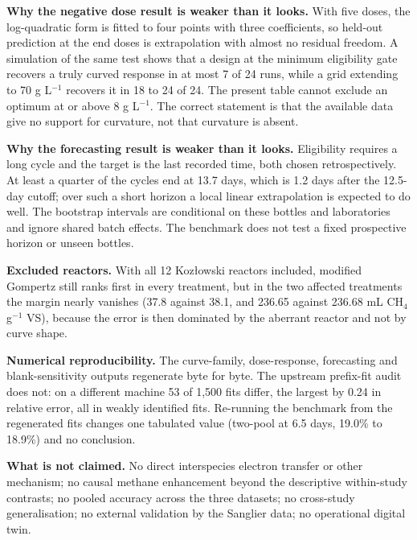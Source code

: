 \documentclass[10pt,a4paper]{article}
\begin{document}
\textbf{Why the negative dose result is weaker than it looks.} With five doses, the log-quadratic form is fitted to four points with three coefficients, so held-out prediction at the end doses is extrapolation with almost no residual freedom. A simulation of the same test shows that a design at the minimum eligibility gate recovers a truly curved response in at most 7 of 24 runs, while a grid extending to 70 g L$^{-1}$ recovers it in 18 to 24 of 24. The present table cannot exclude an optimum at or above 8 g L$^{-1}$. The correct statement is that the available data give no support for curvature, not that curvature is absent.

\textbf{Why the forecasting result is weaker than it looks.} Eligibility requires a long cycle and the target is the last recorded time, both chosen retrospectively. At least a quarter of the cycles end at 13.7 days, which is 1.2 days after the 12.5-day cutoff; over such a short horizon a local linear extrapolation is expected to do well. The bootstrap intervals are conditional on these bottles and laboratories and ignore shared batch effects. The benchmark does not test a fixed prospective horizon or unseen bottles.

\textbf{Excluded reactors.} With all 12 Koz\l{}owski reactors included, modified Gompertz still ranks first in every treatment, but in the two affected treatments the margin nearly vanishes (37.8 against 38.1, and 236.65 against 236.68 mL CH$_4$ g$^{-1}$ VS), because the error is then dominated by the aberrant reactor and not by curve shape.

\textbf{Numerical reproducibility.} The curve-family, dose-response, forecasting and blank-sensitivity outputs regenerate byte for byte. The upstream prefix-fit audit does not: on a different machine 53 of 1,500 fits differ, the largest by 0.24 in relative error, all in weakly identified fits. Re-running the benchmark from the regenerated fits changes one tabulated value (two-pool at 6.5 days, 19.0\% to 18.9\%) and no conclusion.

\textbf{What is not claimed.} No direct interspecies electron transfer or other mechanism; no causal methane enhancement beyond the descriptive within-study contrasts; no pooled accuracy across the three datasets; no cross-study generalisation; no external validation by the Sanglier data; no operational digital twin.
\end{document}
